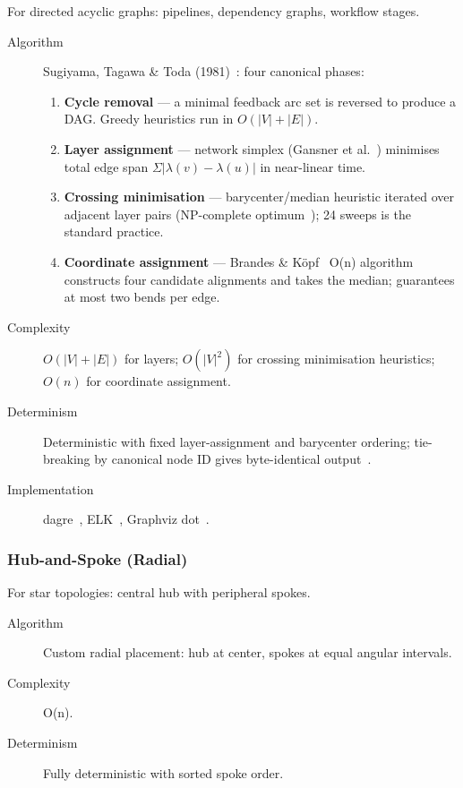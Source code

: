 For directed acyclic graphs: pipelines, dependency graphs, workflow stages.

\begin{description}
  \item[Algorithm] Sugiyama, Tagawa \& Toda (1981)~\cite{sugiyama1981}: four
    canonical phases:
    \begin{enumerate}
      \item \textbf{Cycle removal} --- a minimal feedback arc set is reversed
            to produce a DAG.  Greedy heuristics run in $O(|V|+|E|)$.
      \item \textbf{Layer assignment} --- network simplex (Gansner et
            al.~\cite{gansner1993dot}) minimises total edge span $\Sigma|\lambda(v)-\lambda(u)|$
            in near-linear time.
      \item \textbf{Crossing minimisation} --- barycenter/median heuristic
            iterated over adjacent layer pairs (NP-complete
            optimum~\cite{garey1983}); 24 sweeps is the standard practice.
      \item \textbf{Coordinate assignment} --- Brandes \&
            K{\"o}pf~\cite{brandesKopf2001} O(n) algorithm constructs four
            candidate alignments and takes the median; guarantees at most two
            bends per edge.
    \end{enumerate}
  \item[Complexity] $O(|V| + |E|)$ for layers; $O(|V|^2)$ for crossing
    minimisation heuristics; $O(n)$ for coordinate assignment.
  \item[Determinism] Deterministic with fixed layer-assignment and
    barycenter ordering; tie-breaking by canonical node ID gives
    byte-identical output~\cite{dagre}.
  \item[Implementation] dagre~\cite{dagre}, ELK~\cite{elk}, Graphviz
    dot~\cite{graphviz}.
\end{description}

\subsubsection{Hub-and-Spoke (Radial)}

For star topologies: central hub with peripheral spokes.

\begin{description}
  \item[Algorithm] Custom radial placement: hub at center, spokes at equal angular intervals.
  \item[Complexity] O(n).
  \item[Determinism] Fully deterministic with sorted spoke order.
\end{description}


